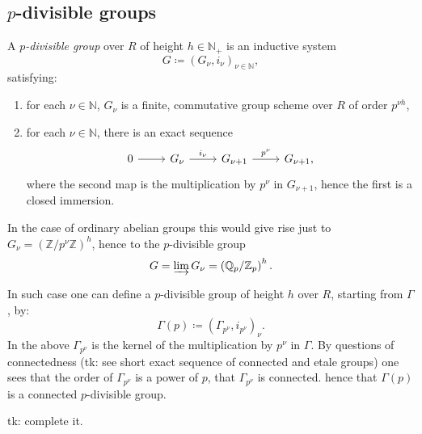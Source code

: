 \documentclass[../Main]{subfiles}
\begin{document}
\subsection{\texorpdfstring{$p$}{p}-divisible groups}
\begin{defn}
	A {\em $p$-divisible group} over $R$ of height $h \in \mathbb{N}_+$ is an inductive system
	\begin{equation*}
	G \coloneqq \left(G_\nu, i_\nu\right)_{\nu \in \mathbb{N}}
	,\end{equation*} 
	satisfying:
	\begin{enumerate}
		\item for each $\nu \in \mathbb{N}$, $G_\nu$ is a finite, commutative group scheme over $R$
			of order $p^{\nu h}$,
		\item for each $\nu \in \mathbb{N}$, there is an exact sequence
			\begin{equation*}
			\begin{tikzcd}
				0 \arrow[r, "", rightarrow] &
				G_\nu \arrow[r, "i_\nu", rightarrow] &
				G_{\nu + 1} \arrow[r, "p^\nu", rightarrow] &
				G_{\nu + 1} 
			,\end{tikzcd}
			\end{equation*}
			where the second map is the multiplication by $p^\nu$ in $G_{\nu + 1}$,
			hence the first is a closed immersion.
	\end{enumerate}
\end{defn}

\begin{rem}[]
	In the case of ordinary abelian groups this would give rise just to 
	$G_\nu = \left( \mathbb{Z}/p^\nu\mathbb{Z} \right)^h$, hence to the $p$-divisible group
	\begin{equation*}
		G = \varinjlim G_\nu = \left( \mathbb{Q}_p / \mathbb{Z}_p \right)^h
	.\end{equation*} 
\end{rem}

\begin{ex}
	In such case one can define a $p$-divisible group of height $h$
	over $R$, starting from $\Gamma$, by:
	\begin{equation*}
		\Gamma(p) \coloneqq \left(\Gamma_{p^\nu}, i_{p^\nu}\right)_\nu
	.\end{equation*} 
	In the above $\Gamma_{p^\nu}$ is the kernel of the multiplication by $p^\nu$ 
	in $\Gamma$.
	By questions of connectedness (tk: see short exact sequence of connected
	and etale groups) one sees that the order of $\Gamma_{p^\nu}$
	is a power of $p$, that $\Gamma_{p^\nu}$ is connected.
	hence that $\Gamma(p)$ is a connected $p$-divisible group.

	tk: complete it.
\end{ex}
\end{document}
